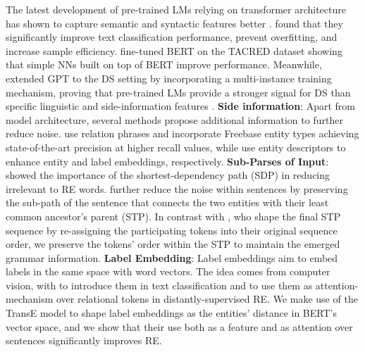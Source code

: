 \documentclass[11pt,a4paper]{article}
\begin{document}
The latest development of pre-trained LMs relying on transformer architecture \cite{Vaswani2017} has shown to capture semantic and syntactic features better \cite{Radford2018}. \citet{Howard2018} found that they significantly improve text classification performance, prevent overfitting, and increase sample efficiency. \citet{Shi2019} fine-tuned BERT \cite{Devlin} on the TACRED dataset showing that simple NNs built on top of BERT improve performance. Meanwhile, \citet{Alt2019} extended GPT \cite{Radford2018} to the DS setting by incorporating a multi-instance training mechanism, proving that pre-trained LMs provide a stronger signal for DS than specific linguistic and side-information features \cite{Vashishth2018}. \newline
\textbf{Side information}:
Apart from model architecture, several methods propose additional information to further reduce noise. \citet{Vashishth2018} use relation phrases and incorporate Freebase entity types achieving state-of-the-art precision at higher recall values, while \cite{Ji2017, Hu2019} use entity descriptors to enhance entity and label embeddings, respectively. \newline
\textbf{Sub-Parses of Input}:
\citet{Xu2015} showed the importance of the shortest-dependency path (SDP) in reducing irrelevant to RE words. \citet{Liu2018} further reduce the noise within sentences by preserving the sub-path of the sentence that connects the two entities with their least common ancestor's parent (STP). In contrast with \cite{Liu2018}, who shape the final STP sequence by re-assigning the participating tokens into their original sequence order, we preserve the tokens' order within the STP to maintain the emerged grammar information.
\newline
\textbf{Label Embedding}:
Label embeddings aim to embed labels in the same space with word vectors. The idea comes from computer vision, with \cite{Wang2018} to introduce them in text classification and \cite{Hu2019} to use them as attention-mechanism over relational tokens in distantly-supervised RE. We make use of the TransE \cite{Bordes2013} model to shape label embeddings as the entities' distance in BERT's vector space, and we show that their use both as a feature and as attention over sentences significantly improves RE. 
\end{document}
